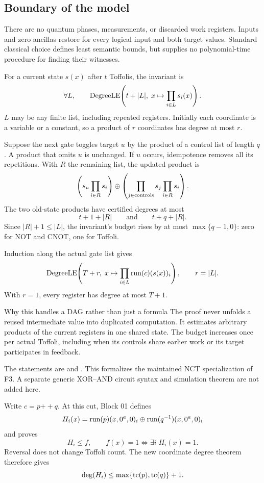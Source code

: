 \subsection*{Boundary of the model}
There are no quantum phases, measurements, or discarded work registers. Inputs and zero ancillas restore for every logical input and both target values. Standard classical choice defines least semantic bounds, but supplies no polynomial-time procedure for finding their witnesses.

For a current state $s(x)$ after $t$ Toffolis, the invariant is
\[
\forall L,\qquad
\operatorname{DegreeLE}\!\left(t+|L|,\;x\mapsto\prod_{i\in L}s_i(x)\right).
\]
$L$ may be any finite list, including repeated registers. Initially each coordinate is a variable or a constant, so a product of $r$ coordinates has degree at most $r$.

Suppose the next gate toggles target $u$ by the product of a control list of length $q$. A product that omits $u$ is unchanged. If $u$ occurs, idempotence removes all its repetitions. With $R$ the remaining list, the updated product is
\[
\left(s_u\prod_{i\in R}s_i\right)
\mathbin{\oplus}
\left(\prod_{j\in\mathrm{controls}}s_j\prod_{i\in R}s_i\right).
\]
The two old-state products have certified degrees at most
\[
t+1+|R|\qquad\text{and}\qquad t+q+|R|.
\]
Since $|R|+1\le |L|$, the invariant's budget rises by at most $\max\{q-1,0\}$: zero for NOT and CNOT, one for Toffoli.

Induction along the actual gate list gives
\[
\operatorname{DegreeLE}\!\left(T+r,\;x\mapsto\prod_{i\in L}\operatorname{run}(c)(s(x))_i\right),
\qquad r=|L|.
\]
With $r=1$, every register has degree at most $T+1$.

\begin{statusbox}{Why this handles a DAG rather than just a formula}
The proof never unfolds a reused intermediate value into duplicated computation. It estimates arbitrary products of the current registers in one shared state. The budget increases once per actual Toffoli, including when its controls share earlier work or its target participates in feedback.
\end{statusbox}

The statements are  and . This formalizes the maintained NCT specialization of F3. A separate generic XOR--AND circuit syntax and simulation theorem are not added here.

Write $c=p\mathbin{++}q$. At this cut, Block 01 defines
\[
H_i(x)=\operatorname{run}(p)(x,0^a,0)_i\mathbin{\oplus}
       \operatorname{run}(q^{-1})(x,0^a,0)_i
\]
and proves
\[
H_i\le f,\qquad f(x)=1\iff\exists i\;H_i(x)=1.
\]
Reversal does not change Toffoli count. The new coordinate degree theorem therefore gives
\[
\deg(H_i)\le\max\{\operatorname{tc}(p),\operatorname{tc}(q)\}+1.
\]

